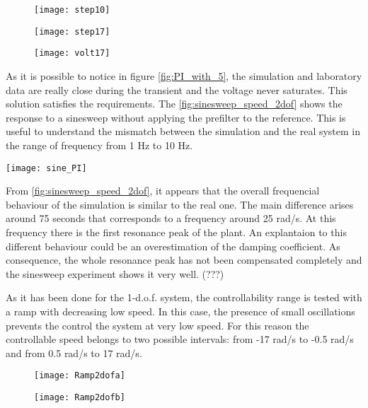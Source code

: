 \newpage
\begin{figure*}[h]
	\centering
\begin{subfigure}{0.4\columnwidth}
	\texttt{[image: step10]}
\end{subfigure}
\begin{subfigure}{0.4\columnwidth}
	\texttt{[image: step17]}
\end{subfigure}
\begin{subfigure}{0.4\columnwidth}
	\texttt{[image: volt17]}
\end{subfigure}
\caption{Speed control loop with  $k_{v} $=5 with low-pass prefilter}
\label{fig:PI_with_5}
\end{figure*}

As it is possible to notice in figure \ref{fig:PI_with_5}, the simulation and laboratory data are really close during the transient and the voltage never saturates. This solution satisfies the requirements. The \cref{fig:sinesweep_speed_2dof} shows the response to a sinesweep without applying the prefilter to the reference.  This is useful to understand the mismatch between the simulation and the real system in the range of frequency from 1 Hz to 10 Hz.

\begin{figure*}[h]
	\centering
	\texttt{[image: sine\_PI]}
	\caption{Sineweep experiment from 1 Hz to 10 Hz in 100s}
	\label{fig:sinesweep_speed_2dof}
\end{figure*}

From \cref{fig:sinesweep_speed_2dof}, it appears that the overall frequencial behaviour of the simulation is similar to the real one. The main difference arises around 75 seconds that corresponds to a frequency around 25 rad/s. At this frequency there is the first resonance peak of the plant. An explantaion to this different behaviour could be an overestimation of the damping coefficient. As consequence, the whole resonance peak has not been compensated completely and the sinesweep experiment shows it very well.
(???)
\par
As it has been done for the 1-d.o.f. system, the controllability range is tested with a ramp with decreasing low speed. In this case, the presence of small oscillations prevents the control the system at very low speed. For this reason the controllable speed belongs to two possible intervals: from -17 rad/s to -0.5 rad/s and from 0.5 rad/s to 17 rad/s.
\begin{figure*}[h]
	\centering
	\begin{subfigure}{0.45\columnwidth}
		\texttt{[image: Ramp2dofa]}
	\end{subfigure}
	\begin{subfigure}{0.45\columnwidth}
		\texttt{[image: Ramp2dofb]}
	\end{subfigure}

	\caption{Ramp experiment from 17 rad/s to 0 rad/s in 100s}
	\label{fig:Ramp2dof}
\end{figure*}

